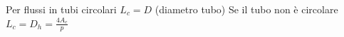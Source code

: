 Per flussi in tubi circolari \(L_c=D\) (diametro tubo) Se il tubo non è
circolare \(L_c=D_h=\frac{4A_c}{p}\)
